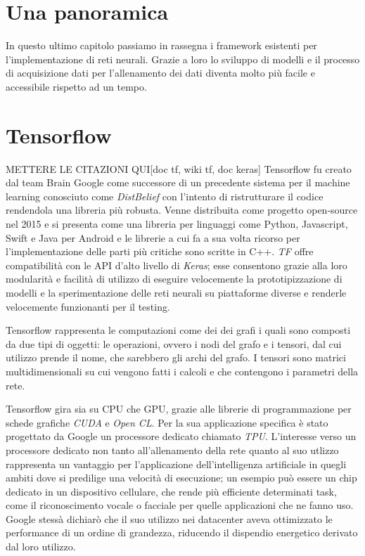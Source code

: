 \section*{Una panoramica}
In questo ultimo capitolo passiamo in rassegna i framework esistenti per l'implementazione di reti neurali. Grazie a loro  lo sviluppo di modelli e il processo di acquisizione dati per l'allenamento dei dati diventa molto più facile e accessibile rispetto ad un tempo. 
\section*{Tensorflow}
METTERE LE CITAZIONI QUI[doc tf, wiki tf, doc keras]
Tensorflow  fu creato dal team Brain Google come successore di un precedente sistema per il machine learning conosciuto come \textit{DistBelief} con l'intento di ristrutturare il codice rendendola una libreria più robusta. Venne distribuita come progetto open-source nel 2015 e si presenta come una libreria per linguaggi come Python, Javascript, Swift e Java per Android  e le librerie a cui fa a sua volta ricorso per l'implementazione delle parti più critiche sono scritte in C++. \textit{TF} offre compatibilità con le API d'alto livello di \textit{Keras}; esse consentono grazie alla loro modularità e facilità di utilizzo di eseguire velocemente la prototipizzazione di modelli e la sperimentazione delle reti neurali su piattaforme diverse e renderle velocemente funzionanti per il testing.

Tensorflow rappresenta le computazioni come dei dei grafi i quali sono composti da due tipi di oggetti: le operazioni, ovvero i nodi del grafo e i tensori, dal cui utilizzo prende il nome, che sarebbero gli archi del grafo.
I tensori sono matrici multidimensionali su cui vengono fatti i calcoli e che contengono i parametri della rete.

Tensorflow gira sia su CPU che GPU, grazie alle librerie di programmazione per schede grafiche \textit{CUDA} e \textit{Open CL}. Per la sua applicazione specifica è stato progettato da Google un processore dedicato chiamato \textit{TPU}. L'interesse verso un processore dedicato non tanto all'allenamento della rete quanto al suo utlizzo rappresenta un vantaggio per l'applicazione dell'intelligenza artificiale in quegli ambiti dove si predilige una velocità di esecuzione; un esempio può essere un chip dedicato in un dispositivo cellulare, che rende più efficiente determinati task, come il riconoscimento vocale o facciale per quelle applicazioni che ne fanno uso. Google stessà dichiarò che il suo utilizzo nei datacenter aveva ottimizzato le performance di un ordine di grandezza, riducendo il dispendio energetico derivato dal loro utilizzo. 